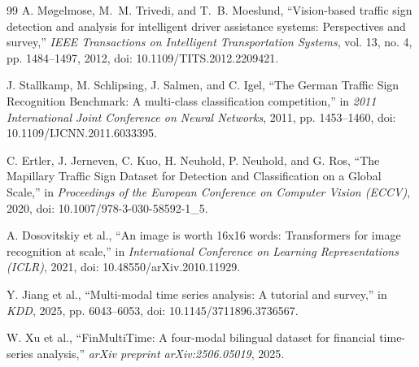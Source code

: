 \documentclass[11pt,a4paper,twoside]{article}
\begin{document}
\begin{thebibliography}{99}
A. M{\o}gelmose, M.~M. Trivedi, and T.~B. Moeslund,
``Vision-based traffic sign detection and analysis for intelligent driver assistance systems: Perspectives and survey,''
\emph{IEEE Transactions on Intelligent Transportation Systems}, vol. 13, no. 4, pp. 1484--1497, 2012, doi: 10.1109/TITS.2012.2209421.

J. Stallkamp, M. Schlipsing, J. Salmen, and C. Igel,
``The German Traffic Sign Recognition Benchmark: A multi-class classification competition,''
in \emph{2011 International Joint Conference on Neural Networks}, 2011, pp. 1453--1460, doi: 10.1109/IJCNN.2011.6033395.

C. Ertler, J. Jerneven, C. Kuo, H. Neuhold, P. Neuhold, and G. Ros,
``The Mapillary Traffic Sign Dataset for Detection and Classification on a Global Scale,''
in \emph{Proceedings of the European Conference on Computer Vision (ECCV)}, 2020, doi: 10.1007/978-3-030-58592-1\_5.

A. Dosovitskiy et al.,
``An image is worth 16x16 words: Transformers for image recognition at scale,''
in \emph{International Conference on Learning Representations (ICLR)}, 2021, doi: 10.48550/arXiv.2010.11929.

Y. Jiang et al.,
``Multi-modal time series analysis: A tutorial and survey,''
in \emph{KDD}, 2025, pp. 6043--6053, doi: 10.1145/3711896.3736567.

W. Xu et al.,
``FinMultiTime: A four-modal bilingual dataset for financial time-series analysis,''
\emph{arXiv preprint arXiv:2506.05019}, 2025.

\end{thebibliography}
\endgroup
\end{document}

